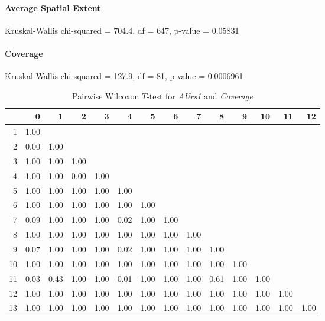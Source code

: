 \paragraph{Average Spatial Extent}
Kruskal-Wallis chi-squared = 704.4, df = 647, p-value = 0.05831

\paragraph{Coverage}
Kruskal-Wallis chi-squared = 127.9, df = 81, p-value = 0.0006961

\begin{table}[ht]
	\small
	\centering
	\begin{tabular}{rrrrrrrrrrrrrr}
		\hline
	   & 0 & 1 & 2 & 3 & 4 & 5 & 6 & 7 & 8 & 9 & 10 & 11 & 12 \\ 
		\hline
	  1 & 1.00 &  &  &  &  &  &  &  &  &  &  &  &  \\ 
		2 & 0.00 & 1.00 &  &  &  &  &  &  &  &  &  &  &  \\ 
		3 & 1.00 & 1.00 & 1.00 &  &  &  &  &  &  &  &  &  &  \\ 
		4 & 1.00 & 1.00 & 0.00 & 1.00 &  &  &  &  &  &  &  &  &  \\ 
		5 & 1.00 & 1.00 & 1.00 & 1.00 & 1.00 &  &  &  &  &  &  &  &  \\ 
		6 & 1.00 & 1.00 & 1.00 & 1.00 & 1.00 & 1.00 &  &  &  &  &  &  &  \\ 
		7 & 0.09 & 1.00 & 1.00 & 1.00 & 0.02 & 1.00 & 1.00 &  &  &  &  &  &  \\ 
		8 & 1.00 & 1.00 & 1.00 & 1.00 & 1.00 & 1.00 & 1.00 & 1.00 &  &  &  &  &  \\ 
		9 & 0.07 & 1.00 & 1.00 & 1.00 & 0.02 & 1.00 & 1.00 & 1.00 & 1.00 &  &  &  &  \\ 
		10 & 1.00 & 1.00 & 1.00 & 1.00 & 1.00 & 1.00 & 1.00 & 1.00 & 1.00 & 1.00 &  &  &  \\ 
		11 & 0.03 & 0.43 & 1.00 & 1.00 & 0.01 & 1.00 & 1.00 & 1.00 & 0.61 & 1.00 & 1.00 &  &  \\ 
		12 & 1.00 & 1.00 & 1.00 & 1.00 & 1.00 & 1.00 & 1.00 & 1.00 & 1.00 & 1.00 & 1.00 & 1.00 &  \\ 
		13 & 1.00 & 1.00 & 1.00 & 1.00 & 1.00 & 1.00 & 1.00 & 1.00 & 1.00 & 1.00 & 1.00 & 1.00 & 1.00 \\ 
		 \hline
	  \end{tabular}
    \caption{Pairwise Wilcoxon $T$-test for \textit{AUrs1} and \textit{Coverage}}
    \label{tbl:wilcoxon_baysis_initiator_AUrs1_Cov}
\end{table}

